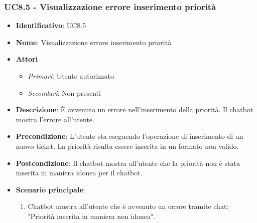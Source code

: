 \subsubsection{UC8.5 - Visualizzazione errore inserimento priorità}
\begin{itemize}
	\item \textbf{Identificativo}: UC8.5
	\item \textbf{Nome}:  Visualizzazione errore inserimento priorità
	\item \textbf{Attori}
	\begin{itemize} 
		\item \textit{Primari}: Utente autorizzato
		\item \textit{Secondari}: Non presenti
	\end{itemize}
	\item \textbf{Descrizione}: È avvenuto un errore nell'inserimento della priorità. Il chatbot mostra l'errore all'utente.
	\item \textbf{Precondizione}: L'utente sta eseguendo l'operazione di inserimento di un nuovo ticket. La priorità risulta essere inserita in un formato non valido. 
	\item \textbf{Postcondizione}: Il chatbot mostra all'utente che la priorità non è stata inserita in maniera idonea per il chatbot.
	\item \textbf{Scenario principale}: \begin{enumerate}
		\item Chatbot mostra all'utente che è avvenuto un errore tramite chat: "Priorità inserita in maniera non idonea".
	\end{enumerate}
\end{itemize}
